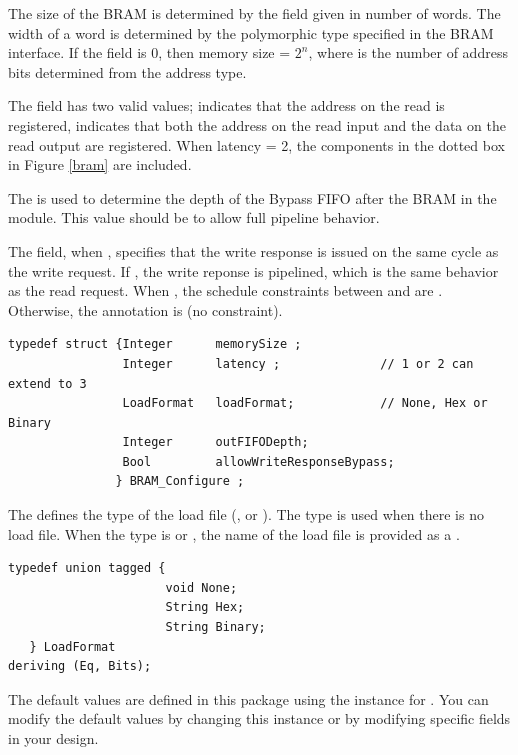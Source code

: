 The size of the BRAM is determined by the  field given
in number of words.  The width of a word is determined by the
polymorphic type  specified in the BRAM interface. If
the  field is 0, then  memory size = $ 2^{n}$, where
 is the number 
of address bits determined from the address type.

The  field has two valid values;  indicates that the
address on the read is registered,  indicates that both the
address on the read input and the  data on the read output  are
registered.  When latency = 2, the components in the dotted box in
Figure \ref{bram} are included.

The  is  used to determine the depth of the Bypass
FIFO after the BRAM in  the   module.  This value
should be  to allow full pipeline behavior.

The  field, when , 
specifies that the write response is issued on the same cycle as the
write request.  If , the write reponse is pipelined, which is 
 the same behavior as the read request. When , the schedule
 constraints between  and  are .
 Otherwise, the annotation is  (no constraint).



\begin{verbatim}
typedef struct {Integer      memorySize ;
                Integer      latency ;              // 1 or 2 can extend to 3
                LoadFormat   loadFormat;            // None, Hex or Binary
                Integer      outFIFODepth;
                Bool         allowWriteResponseBypass;
               } BRAM_Configure ;
\end{verbatim}

The  defines the type of the load file (,
  or ). The type  is used when there is no
 load file.  When the type is  or , the
 name of the load file is provided as  a . 

\begin{verbatim}
typedef union tagged {
                      void None;
                      String Hex;
                      String Binary;
   } LoadFormat
deriving (Eq, Bits);
\end{verbatim}

The default values are defined in this package using the
 instance for .  You can modify
the default values by changing this instance or by modifying specific
fields in your design.

